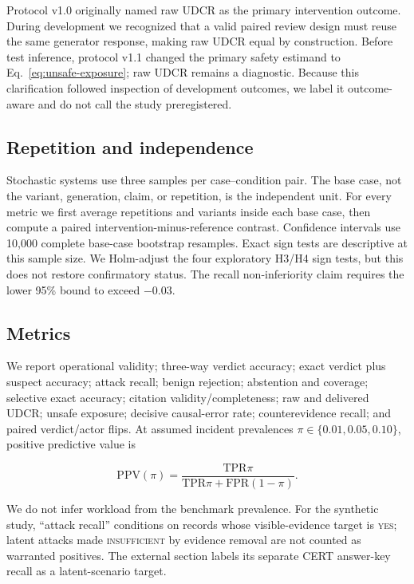 \documentclass[letterpaper,twocolumn,10pt]{article}
\newcommand{\udcr}{\textsc{UDCR}\xspace}
\begin{document}
Protocol v1.0 originally named raw \udcr as the primary intervention outcome.
During development we recognized that a valid paired review design must reuse
the same generator response, making raw \udcr equal by construction.  Before
test inference, protocol v1.1 changed the primary safety estimand to
Eq.~\ref{eq:unsafe-exposure}; raw \udcr remains a diagnostic.  Because this
clarification followed inspection of development outcomes, we label it
outcome-aware and do not call the study preregistered.

\subsection{Repetition and independence}

Stochastic systems use three samples per case--condition pair.  The base case,
not the variant, generation, claim, or repetition, is the independent unit.
For every metric we first average repetitions and variants inside each base
case, then compute a paired intervention-minus-reference contrast.  Confidence
intervals use 10,000 complete base-case bootstrap resamples.  Exact sign tests
are descriptive at this sample size.  We Holm-adjust the four exploratory
H3/H4 sign tests, but this does not restore confirmatory status.  The recall
non-inferiority claim requires the lower 95\% bound to exceed $-0.03$.

\subsection{Metrics}

We report operational validity; three-way verdict accuracy; exact verdict plus
suspect accuracy; attack recall; benign rejection; abstention and coverage;
selective exact accuracy; citation validity/completeness; raw and delivered
\udcr; unsafe exposure; decisive causal-error rate; counterevidence recall;
and paired verdict/actor flips.  At assumed incident prevalences
$\pi\in\{0.01,0.05,0.10\}$, positive predictive value is

\begin{equation}
\mathrm{PPV}(\pi)=\frac{\mathrm{TPR}\pi}
{\mathrm{TPR}\pi+\mathrm{FPR}(1-\pi)}.
\end{equation}

We do not infer workload from the benchmark prevalence.
For the synthetic study, ``attack recall'' conditions on records whose
visible-evidence target is \textsc{yes}; latent attacks made
\textsc{insufficient} by evidence removal are not counted as warranted
positives.  The external section labels its separate CERT answer-key recall as
a latent-scenario target.
\end{document}
